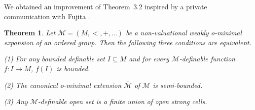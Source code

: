 \documentclass{amsart}
\theoremstyle{definition}
\theoremstyle{plain}
\newtheorem{theorem}[definition]{Theorem}
\begin{document}
We obtained an improvement of Theorem~3.2
inspired by a private communication with Fujita \cite{F}.



\begin{theorem}
Let $\mathcal{M}=(M, <, +, \dots)$ be a non-valuational weakly o-minimal expansion of an ordered group.
Then the following three conditions are equivalent.


(1)   
For any bounded definable set $I \subseteq M$ and for every $\mathcal{M}$-definable function $f:I \to \overline{M}$,
$f(I)$ is bounded.

(2) The canonical o-minimal extension $\overline{\mathcal{M}}$ of $\mathcal{M}$ is semi-bounded.

(3) Any $\mathcal{M}$-definable open set is a finite union of open strong cells.
\end{theorem}
\end{document}
